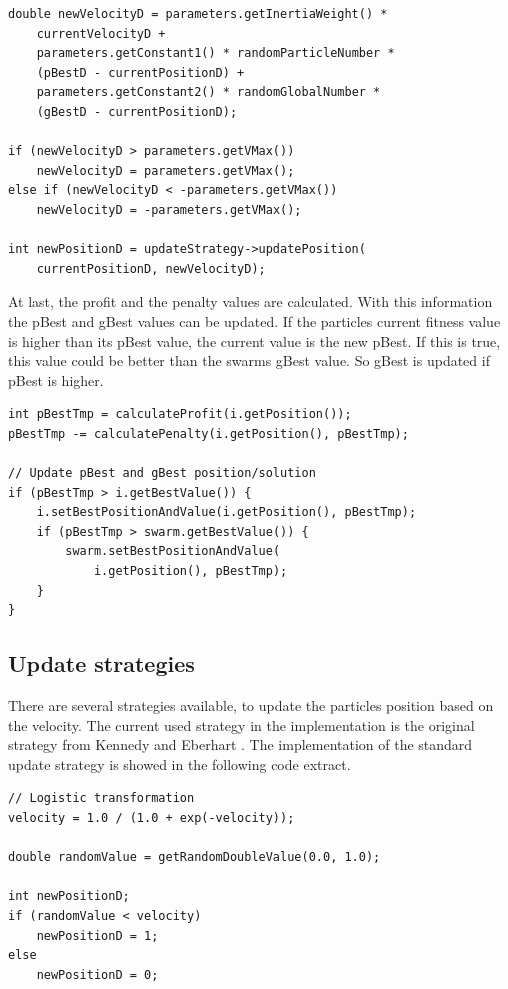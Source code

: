 \documentclass{article}
\begin{document}
\begin{lstlisting}[caption="Solver.cpp"]
double newVelocityD = parameters.getInertiaWeight() *
	currentVelocityD +
	parameters.getConstant1() * randomParticleNumber *
	(pBestD - currentPositionD) +
	parameters.getConstant2() * randomGlobalNumber *
	(gBestD - currentPositionD);

if (newVelocityD > parameters.getVMax())
    newVelocityD = parameters.getVMax();
else if (newVelocityD < -parameters.getVMax())
    newVelocityD = -parameters.getVMax();

int newPositionD = updateStrategy->updatePosition(
	currentPositionD, newVelocityD);
\end{lstlisting}

At last, the profit and the penalty values are calculated. With this information the pBest and gBest values can be updated. If the particles current fitness value is higher than its pBest value, the current value is the new pBest. If this is true, this value could be better than the swarms gBest value. So gBest is updated if pBest is higher.\\

\begin{lstlisting}[caption="Solver.cpp"]
int pBestTmp = calculateProfit(i.getPosition());
pBestTmp -= calculatePenalty(i.getPosition(), pBestTmp);

// Update pBest and gBest position/solution
if (pBestTmp > i.getBestValue()) {
	i.setBestPositionAndValue(i.getPosition(), pBestTmp);
	if (pBestTmp > swarm.getBestValue()) {
	    swarm.setBestPositionAndValue(
	    	i.getPosition(), pBestTmp);
	}
}
\end{lstlisting}

\newpage

\subsection{Update strategies}
There are several strategies available, to update the particles position based on the velocity. The current used strategy in the implementation is the original strategy from Kennedy and Eberhart \cite{bib-discrete}. The implementation of the standard update strategy is showed in the following code extract.\\

\begin{lstlisting}[caption="UpdateStrategy.cpp"]
// Logistic transformation
velocity = 1.0 / (1.0 + exp(-velocity));

double randomValue = getRandomDoubleValue(0.0, 1.0);

int newPositionD;
if (randomValue < velocity)
    newPositionD = 1;
else
    newPositionD = 0;
\end{lstlisting}
\end{document}
